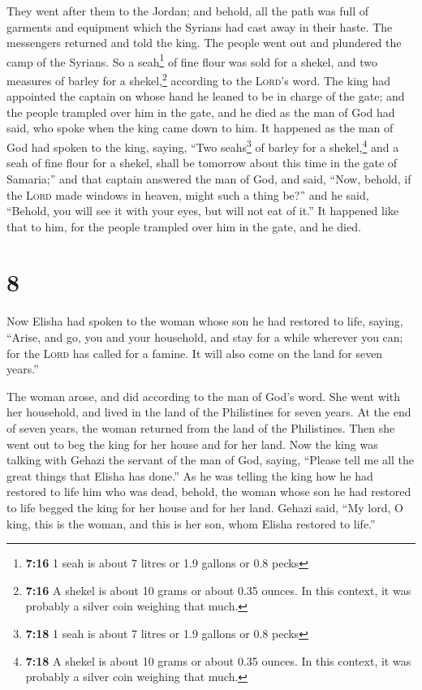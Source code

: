  They went after them to the Jordan; and behold, all the
path was full of garments and equipment which the Syrians had cast away
in their haste. The messengers returned and told the king.
 The people went out and plundered the camp of the
Syrians. So a seah\footnote{\textbf{7:16} 1 seah is about 7 litres or
  1.9 gallons or 0.8 pecks} of fine flour was sold for a shekel, and two
measures of barley for a shekel,\footnote{\textbf{7:16} A shekel is
  about 10 grams or about 0.35 ounces. In this context, it was probably
  a silver coin weighing that much.} according to the \textsc{Lord}'s
word.  The king had appointed the captain on whose hand
he leaned to be in charge of the gate; and the people trampled over him
in the gate, and he died as the man of God had said, who spoke when the
king came down to him.  It happened as the man of God had
spoken to the king, saying, ``Two seahs\footnote{\textbf{7:18} 1 seah is
  about 7 litres or 1.9 gallons or 0.8 pecks} of barley for a
shekel,\footnote{\textbf{7:18} A shekel is about 10 grams or about 0.35
  ounces. In this context, it was probably a silver coin weighing that
  much.} and a seah of fine flour for a shekel, shall be tomorrow about
this time in the gate of Samaria;''  and that captain
answered the man of God, and said, ``Now, behold, if the \textsc{Lord}
made windows in heaven, might such a thing be?'' and he said, ``Behold,
you will see it with your eyes, but will not eat of it.''
 It happened like that to him, for the people trampled
over him in the gate, and he died.

\hypertarget{section-7}{%
\section{8}\label{section-7}}

 Now Elisha had spoken to the woman whose son he had
restored to life, saying, ``Arise, and go, you and your household, and
stay for a while wherever you can; for the \textsc{Lord} has called for
a famine. It will also come on the land for seven years.''

 The woman arose, and did according to the man of God's
word. She went with her household, and lived in the land of the
Philistines for seven years.  At the end of seven years,
the woman returned from the land of the Philistines. Then she went out
to beg the king for her house and for her land.  Now the
king was talking with Gehazi the servant of the man of God, saying,
``Please tell me all the great things that Elisha has done.''
 As he was telling the king how he had restored to life
him who was dead, behold, the woman whose son he had restored to life
begged the king for her house and for her land. Gehazi said, ``My lord,
O king, this is the woman, and this is her son, whom Elisha restored to
life.''

